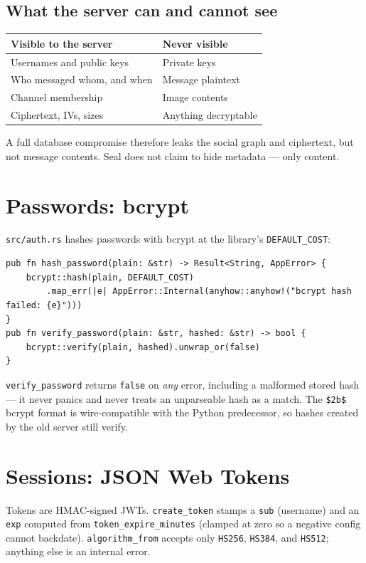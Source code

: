 \subsection*{What the server can and cannot see}
\begin{center}
\begin{tabular}{@{}ll@{}}
\toprule
\textbf{Visible to the server} & \textbf{Never visible} \\
\midrule
Usernames and public keys & Private keys \\
Who messaged whom, and when & Message plaintext \\
Channel membership & Image contents \\
Ciphertext, IVs, sizes & Anything decryptable \\
\bottomrule
\end{tabular}
\end{center}

A full database compromise therefore leaks the social graph and ciphertext, but
not message contents. Seal does not claim to hide metadata --- only content.

\section{Passwords: bcrypt}

\verb|src/auth.rs| hashes passwords with bcrypt at the library's
\verb|DEFAULT_COST|:

\begin{lstlisting}
pub fn hash_password(plain: &str) -> Result<String, AppError> {
    bcrypt::hash(plain, DEFAULT_COST)
        .map_err(|e| AppError::Internal(anyhow::anyhow!("bcrypt hash failed: {e}")))
}
pub fn verify_password(plain: &str, hashed: &str) -> bool {
    bcrypt::verify(plain, hashed).unwrap_or(false)
}
\end{lstlisting}

\verb|verify_password| returns \verb|false| on \emph{any} error, including a
malformed stored hash --- it never panics and never treats an unparseable hash as
a match. The \verb|$2b$| bcrypt format is wire-compatible with the Python
predecessor, so hashes created by the old server still verify.

\section{Sessions: JSON Web Tokens}

Tokens are HMAC-signed JWTs. \verb|create_token| stamps a \verb|sub| (username)
and an \verb|exp| computed from \verb|token_expire_minutes| (clamped at zero so a
negative config cannot backdate). \verb|algorithm_from| accepts only
\verb|HS256|, \verb|HS384|, and \verb|HS512|; anything else is an internal error.

